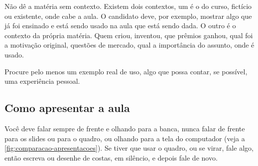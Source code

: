 \documentclass[12pt]{article}
\begin{document}
Não dê a matéria sem contexto. Existem dois contextos, um é o do curso, fictício ou existente, onde cabe a aula. O candidato deve, por exemplo, mostrar algo que já foi ensinado e está sendo usado na aula que está sendo dada. O outro é o contexto da própria matéria. Quem criou, inventou, que prêmios ganhou, qual foi a motivação original, questões de mercado, qual a importância do assunto, onde é usado.

Procure pelo menos um exemplo real de uso, algo que possa contar, se possível, uma experiência pessoal.

\subsection{Como apresentar a aula}

Você deve falar sempre de frente e olhando para a banca, nunca falar de frente para os slides ou para o quadro, ou olhando para a tela do computador (veja a \autoref{fig:comparacao-apresentacoes}). Se tiver que usar o quadro, ou se virar, fale algo, então escreva ou desenhe de costas, em silêncio, e depois fale de novo.
\end{document}
